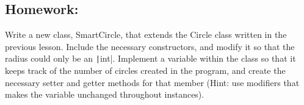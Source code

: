 \documentclass[11pt,fleqn]{article}
\newcommand{\mil}[2][java]{\texttt|#2|}
\begin{document}
\subsection*{Homework:} Write a new class, SmartCircle, that extends the Circle class written in the previous lesson. Include the necessary constructors, and modify it so that the radius could only be an \mil{int}. Implement a variable within the class so that it keeps track of the number of circles created in the program, and create the necessary setter and getter methods for that member (Hint: use modifiers that makes the variable unchanged throughout instances).
\end{document}
